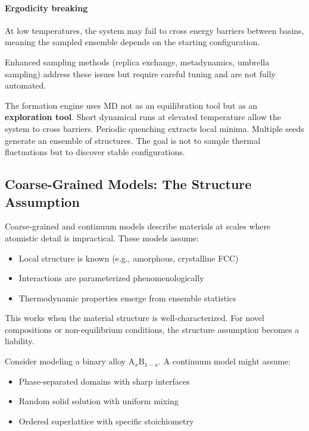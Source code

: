 \documentclass[11pt]{article}
\begin{document}
\paragraph{Ergodicity breaking} At low temperatures, the system may fail to cross energy barriers between basins, meaning the sampled ensemble depends on the starting configuration.

Enhanced sampling methods (replica exchange, metadynamics, umbrella sampling) address these issues but require careful tuning and are not fully automated.

The formation engine uses MD not as an equilibration tool but as an \textbf{exploration tool}. Short dynamical runs at elevated temperature allow the system to cross barriers. Periodic quenching extracts local minima. Multiple seeds generate an ensemble of structures. The goal is not to sample thermal fluctuations but to discover stable configurations.

\subsection{Coarse-Grained Models: The Structure Assumption}

Coarse-grained and continuum models describe materials at scales where atomistic detail is impractical. These models assume:

\begin{itemize}
\item Local structure is known (e.g., amorphous, crystalline FCC)
\item Interactions are parameterized phenomenologically
\item Thermodynamic properties emerge from ensemble statistics
\end{itemize}

This works when the material structure is well-characterized. For novel compositions or non-equilibrium conditions, the structure assumption becomes a liability.

Consider modeling a binary alloy $\text{A}_x\text{B}_{1-x}$. A continuum model might assume:

\begin{itemize}
\item Phase-separated domains with sharp interfaces
\item Random solid solution with uniform mixing
\item Ordered superlattice with specific stoichiometry
\end{itemize}
\end{document}
